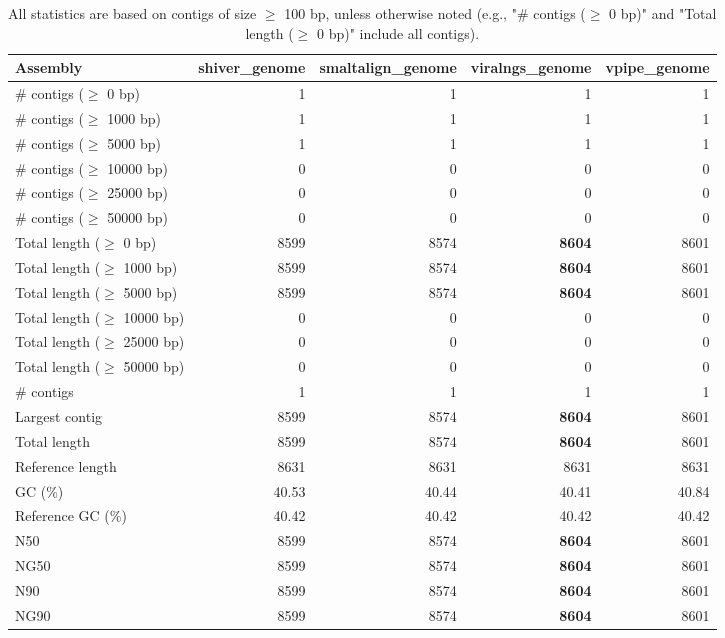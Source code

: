 \documentclass[12pt,a4paper]{article}
\begin{document}
\begin{table}[ht]
\begin{center}
\caption{All statistics are based on contigs of size $\geq$ 100 bp, unless otherwise noted (e.g., "\# contigs ($\geq$ 0 bp)" and "Total length ($\geq$ 0 bp)" include all contigs).}
\begin{tabular}{|l*{4}{|r}|}
\hline
Assembly & shiver\_genome & smaltalign\_genome & viralngs\_genome & vpipe\_genome \\ \hline
\# contigs ($\geq$ 0 bp) & 1 & 1 & 1 & 1 \\ \hline
\# contigs ($\geq$ 1000 bp) & 1 & 1 & 1 & 1 \\ \hline
\# contigs ($\geq$ 5000 bp) & 1 & 1 & 1 & 1 \\ \hline
\# contigs ($\geq$ 10000 bp) & 0 & 0 & 0 & 0 \\ \hline
\# contigs ($\geq$ 25000 bp) & 0 & 0 & 0 & 0 \\ \hline
\# contigs ($\geq$ 50000 bp) & 0 & 0 & 0 & 0 \\ \hline
Total length ($\geq$ 0 bp) & 8599 & 8574 & {\bf 8604} & 8601 \\ \hline
Total length ($\geq$ 1000 bp) & 8599 & 8574 & {\bf 8604} & 8601 \\ \hline
Total length ($\geq$ 5000 bp) & 8599 & 8574 & {\bf 8604} & 8601 \\ \hline
Total length ($\geq$ 10000 bp) & 0 & 0 & 0 & 0 \\ \hline
Total length ($\geq$ 25000 bp) & 0 & 0 & 0 & 0 \\ \hline
Total length ($\geq$ 50000 bp) & 0 & 0 & 0 & 0 \\ \hline
\# contigs & 1 & 1 & 1 & 1 \\ \hline
Largest contig & 8599 & 8574 & {\bf 8604} & 8601 \\ \hline
Total length & 8599 & 8574 & {\bf 8604} & 8601 \\ \hline
Reference length & 8631 & 8631 & 8631 & 8631 \\ \hline
GC (\%) & 40.53 & 40.44 & 40.41 & 40.84 \\ \hline
Reference GC (\%) & 40.42 & 40.42 & 40.42 & 40.42 \\ \hline
N50 & 8599 & 8574 & {\bf 8604} & 8601 \\ \hline
NG50 & 8599 & 8574 & {\bf 8604} & 8601 \\ \hline
N90 & 8599 & 8574 & {\bf 8604} & 8601 \\ \hline
NG90 & 8599 & 8574 & {\bf 8604} & 8601 \\ \hline

\end{tabular}
\end{center}
\end{table}
\end{document}
